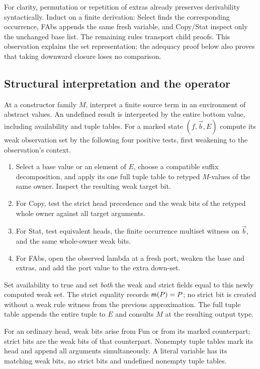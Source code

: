 For clarity, permutation or repetition of extras already preserves
derivability syntactically. Induct on a finite derivation: Select finds
the corresponding occurrence, FAbs appends the same fresh variable,
and Copy/Stat inspect only the unchanged base list. The remaining rules
transport child proofs. This observation explains the set representation;
the adequacy proof below also proves that taking downward closure loses
no comparison.

\subsection{Structural interpretation and the operator}
At a constructor family $M$, interpret a finite source term in an
environment of abstract values. An undefined result is interpreted by
the entire bottom value, including availability and tuple tables.
For a marked state $(f,\vec b,E)$ compute its weak observation set by
the following four positive tests, first weakening to the observation's
context.
\begin{enumerate}
\item Select a base value or an element of $E$, choose a compatible
suffix decomposition, and apply its one full tuple table to retyped
$M$-values of the same owner. Inspect the resulting weak target bit.
\item For Copy, test the strict head precedence and the weak bits of
the retyped whole owner against all target arguments.
\item For Stat, test equivalent heads, the finite occurrence multiset
witness on $\vec b$, and the same whole-owner weak bits.
\item For FAbs, open the observed lambda at a fresh port, weaken the
base and extras, and add the port value to the extra down-set.
\end{enumerate}
Set availability to true and set \emph{both} the weak and strict fields
equal to this newly computed weak set. The strict equality records
$\mathsf m(P)=P$; no strict bit is created without a weak rule witness from
the previous approximation. The full tuple table appends the entire
tuple to $E$ and consults $M$ at the resulting output type.

For an ordinary head, weak bits arise from Fun or from its marked
counterpart; strict bits are the weak bits of that counterpart. Nonempty
tuple tables mark its head and append all arguments simultaneously.
A literal variable has its matching weak bits, no strict bits and
undefined nonempty tuple tables.

